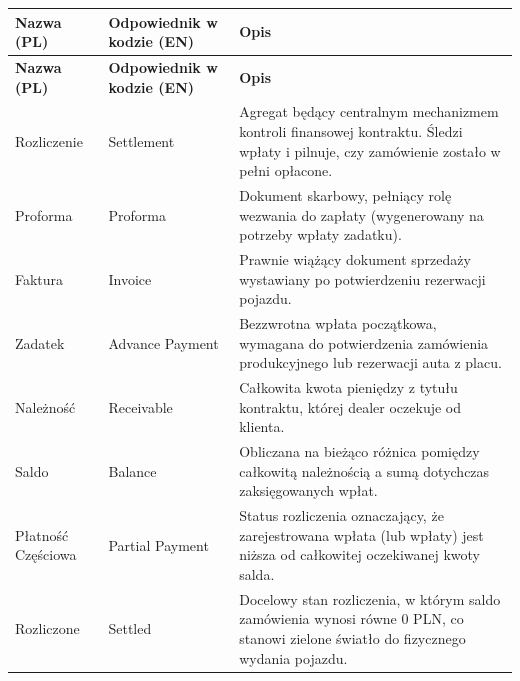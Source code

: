 \begin{longtable}{|p{4cm}|p{4cm}|p{8cm}|}
\hline
\textbf{Nazwa (PL)} & \textbf{Odpowiednik w kodzie (EN)} & \textbf{Opis} \\
\hline
\endfirsthead

\hline
\textbf{Nazwa (PL)} & \textbf{Odpowiednik w kodzie (EN)} & \textbf{Opis} \\
\hline
\endhead

Rozliczenie & Settlement & Agregat będący centralnym mechanizmem kontroli finansowej kontraktu. Śledzi wpłaty i pilnuje, czy zamówienie zostało w pełni opłacone. \\
\hline

Proforma & Proforma & Dokument skarbowy, pełniący rolę wezwania do zapłaty (wygenerowany na potrzeby wpłaty zadatku). \\
\hline

Faktura & Invoice & Prawnie wiążący dokument sprzedaży wystawiany po potwierdzeniu rezerwacji pojazdu. \\
\hline

Zadatek & Advance Payment & Bezzwrotna wpłata początkowa, wymagana do potwierdzenia zamówienia produkcyjnego lub rezerwacji auta z placu. \\
\hline

Należność & Receivable & Całkowita kwota pieniędzy z tytułu kontraktu, której dealer oczekuje od klienta. \\
\hline

Saldo & Balance & Obliczana na bieżąco różnica pomiędzy całkowitą należnością a sumą dotychczas zaksięgowanych wpłat. \\
\hline

Płatność Częściowa & Partial Payment & Status rozliczenia oznaczający, że zarejestrowana wpłata (lub wpłaty) jest niższa od całkowitej oczekiwanej kwoty salda. \\
\hline

Rozliczone & Settled & Docelowy stan rozliczenia, w którym saldo zamówienia wynosi równe 0 PLN, co stanowi zielone światło do fizycznego wydania pojazdu. \\
\hline
\end{longtable}